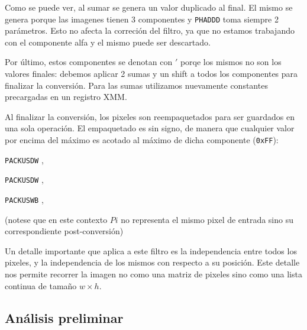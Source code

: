Como se puede ver, al sumar se genera un valor duplicado al final. El mismo se genera porque las imagenes tienen 3 componentes y \texttt{PHADDD} toma siempre 2 parámetros. Esto no afecta la correción del filtro, ya que no estamos trabajando con el componente alfa y el mismo puede ser descartado.

Por último, estos componentes se denotan con $'$ porqe los mismos no son los valores finales: debemos aplicar 2 sumas y un shift a todos los componentes para finalizar la conversión. Para las sumas utilizamos nuevamente constantes precargadas en un registro XMM.

Al finalizar la conversión, los pixeles son reempaquetados para ser guardados en una sola operación. El empaquetado es sin signo, de manera que cualquier valor por encima del máximo es acotado al máximo de dicha componente (\texttt{0xFF}):

\begin{center}
	 

	 

	 

	 

	\texttt{PACKUSDW} ,  \hfill

	 

	\texttt{PACKUSDW} ,  \hfill

	 

	\texttt{PACKUSWB} ,  \hfill

	 
\end{center}

(notese que en este contexto $Pi$ no representa el mismo pixel de entrada sino su correspondiente post-conversión)

Un detalle importante que aplica a este filtro es la independencia entre todos los pixeles, y la independencia de los mismos con respecto a su posición. Este detalle nos permite recorrer la imagen no como una matriz de pixeles sino como una lista continua de tamaño $w \times h$.

\subsection{Análisis preliminar}

